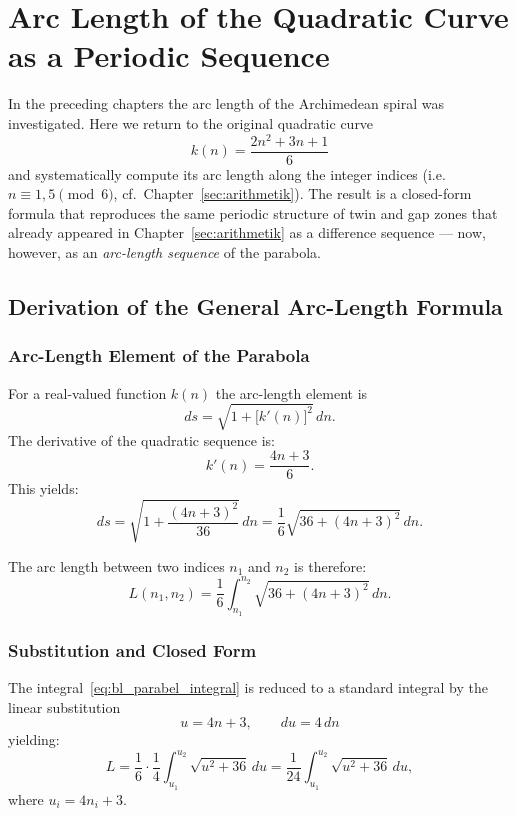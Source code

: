 \chapter{Arc Length of the Quadratic Curve as a Periodic Sequence}
\label{sec:bogenlaenge_parabel}

In the preceding chapters the arc length of the Archimedean spiral was
investigated. Here we return to the original quadratic curve
\[
  k(n) = \frac{2n^2 + 3n + 1}{6}
\]
and systematically compute its arc length along the integer
indices (i.e.\ $n \equiv 1, 5 \pmod{6}$, cf.\ Chapter~\ref{sec:arithmetik}).
The result is a closed-form formula that reproduces the same periodic
structure of twin and gap zones that already appeared in
Chapter~\ref{sec:arithmetik} as a difference sequence ---
now, however, as an \emph{arc-length sequence} of the parabola.

\section{Derivation of the General Arc-Length Formula}
\label{sec:bl_herleitung}

\subsection{Arc-Length Element of the Parabola}

For a real-valued function $k(n)$ the arc-length element is
\[
  ds = \sqrt{1 + \bigl[k'(n)\bigr]^2}\,dn.
\]
The derivative of the quadratic sequence is:
\[
  k'(n) = \frac{4n+3}{6}.
\]
This yields:
\[
  ds = \sqrt{1 + \frac{(4n+3)^2}{36}}\,dn
     = \frac{1}{6}\sqrt{36 + (4n+3)^2}\,dn.
\]

The arc length between two indices $n_1$ and $n_2$ is therefore:
\begin{equation}\label{eq:bl_parabel_integral}
  L(n_1, n_2)
  = \frac{1}{6}\int_{n_1}^{n_2} \sqrt{36 + (4n+3)^2}\,dn.
\end{equation}

\subsection{Substitution and Closed Form}

The integral~\eqref{eq:bl_parabel_integral} is reduced to a standard
integral by the linear substitution
\[
  u = 4n + 3, \qquad du = 4\,dn
\]
yielding:
\[
  L = \frac{1}{6} \cdot \frac{1}{4}
      \int_{u_1}^{u_2} \sqrt{u^2 + 36}\,du
  = \frac{1}{24}\int_{u_1}^{u_2} \sqrt{u^2 + 36}\,du,
\]
where $u_i = 4n_i + 3$.

